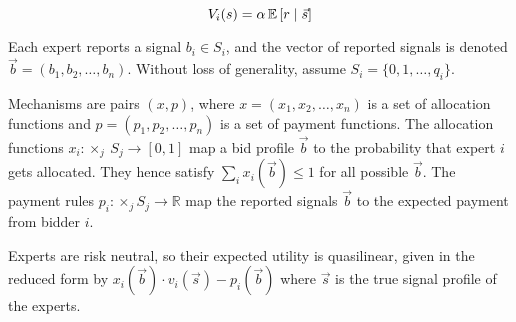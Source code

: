 
$$
V_i(s) = \alpha \operatorname*{\mathbb E} \left[r \mid \vec{s} \right]
$$




Each expert reports a signal $b_i\in S_i$, and the vector of reported signals is denoted $\vec{b}=( b_1, b_2, \ldots, b_n)$.
Without loss of generality, assume $S_i=\{0,1,\ldots,q_i\}$.



Mechanisms are pairs $(x,p)$, where $x=(x_1,x_2,\ldots,x_n)$ is a set of allocation functions and $p=(p_1,p_2,\ldots,p_n)$ is a set of payment functions.
The allocation functions $x_i:\times_j \ S_j\rightarrow [0,1]$ map a bid profile $\vec{b}$ to the probability that expert $i$ gets allocated. They hence satisfy $\sum_i x_i(\vec{b}) \leq 1$ for all possible $\vec{b}$.
The payment rules $p_i: \times _j S_j \rightarrow \mathbb R$ map the reported signals $\vec{b}$ to the expected payment from bidder $i$.

Experts are risk neutral, so their expected utility is quasilinear, given in the reduced form by $x_i (\vec{b}) \cdot v_i(\vec{s}) - p_i(\vec{b})$ where $\vec{s}$ is the true signal profile of the experts.






